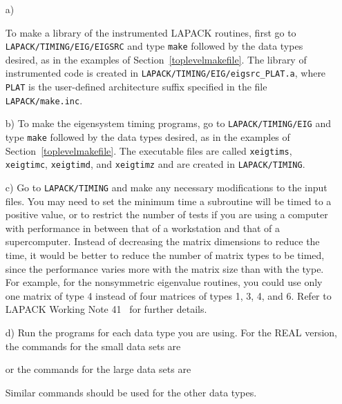 \begin{itemize}
\item[a)]
\begin{sloppypar}
To make a library of the instrumented LAPACK routines, first
go to {\tt LAPACK/TIMING/EIG/EIGSRC} and type {\tt make} followed
by the data types desired, as in the examples of Section~\ref{toplevelmakefile}. 
The library of instrumented code is created in
{\tt LAPACK/TIMING/EIG/eigsrc\_PLAT.a},
where {\tt PLAT} is the user-defined architecture suffix specified in the
file {\tt LAPACK/make.inc}.
\end{sloppypar}

\item[b)]
To make the eigensystem timing programs, 
go to {\tt LAPACK/TIMING/EIG} and
type {\tt make} followed by the data types desired, as in the examples
of Section~\ref{toplevelmakefile}.  The executable files are called
{\tt xeigtims}, {\tt xeigtimc}, {\tt xeigtimd}, and {\tt xeigtimz}
and are created in {\tt LAPACK/TIMING}.

\item[c)]
Go to {\tt LAPACK/TIMING} and
make any necessary modifications to the input files.
You may need to set the minimum time a subroutine will
be timed to a positive value, or to restrict the number of tests
if you are using a computer with performance in between that of a
workstation and that of a supercomputer.
Instead of decreasing the matrix dimensions to reduce the time,
it would be better to reduce the number of matrix types to be timed,
since the performance varies more with the matrix size than with the
type.  For example, for the nonsymmetric eigenvalue routines,
you could use only one matrix of type 4 instead of four matrices of
types 1, 3, 4, and 6.
Refer to LAPACK Working Note 41~\cite{WN41} for further details.

\item[d)]
Run the programs for each data type you are using. 
For the REAL version, the commands for the small data sets are

or the commands for the large data sets are

\noindent
Similar commands should be used for the other data types.
\end{itemize}

